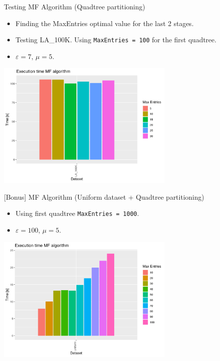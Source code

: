 \documentclass{beamer}
\begin{document}
\begin{frame}{Testing MF Algorithm (Quadtree partitioning)}
    \begin{itemize}
        \item Finding the MaxEntries optimal value for the last 2 stages.
        \item Testing LA\_100K. Using \texttt{MaxEntries = 100} for the first quadtree.
        \item $\varepsilon = 7$, $\mu = 5$.
    \end{itemize}
    \centering
    \includegraphics[width=0.65\textwidth]{figures/07_Quadtree2LA_100K2.png}
\end{frame}

\begin{frame}{[Bonus] MF Algorithm (Uniform dataset + Quadtree partitioning)}
    \begin{itemize}
        \item Using first quadtree \texttt{MaxEntries = 1000}.
        \item $\varepsilon = 100$, $\mu = 5$.        
    \end{itemize}
    \centering
    \includegraphics[width=0.65\textwidth]{figures/08_Quadtree2uniform.png}
\end{frame}
\end{document}
